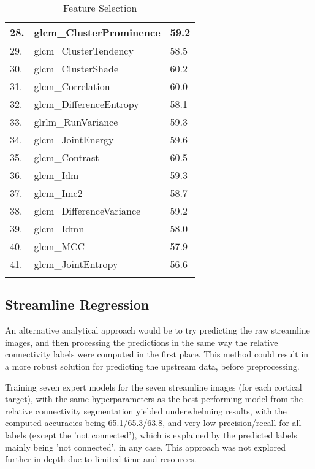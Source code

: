 \begin{longtable}[H]{|l|l|l|}
28. & glcm\_ClusterProminence & 59.2 \\ \hline
29. & glcm\_ClusterTendency & 58.5 \\ \hline
30. & glcm\_ClusterShade & 60.2 \\ \hline
31. & glcm\_Correlation & 60.0 \\ \hline
32. & glcm\_DifferenceEntropy & 58.1 \\ \hline
33. & glrlm\_RunVariance & 59.3 \\ \hline
34. & glcm\_JointEnergy & 59.6 \\ \hline
35. & glcm\_Contrast & 60.5 \\ \hline
36. & glcm\_Idm & 59.3 \\ \hline
37. & glcm\_Imc2 & 58.7 \\ \hline
38. & glcm\_DifferenceVariance & 59.2 \\ \hline
39. & glcm\_Idmn & 58.0 \\ \hline
40. & glcm\_MCC & 57.9 \\ \hline
41. & glcm\_JointEntropy & 56.6 \\ \hline
\caption{Feature Selection}
\label{tab:sbf}
\end{longtable}

\subsection{Streamline Regression}

An alternative analytical approach would be to try predicting the raw streamline images, and then processing the predictions in the same way the relative connectivity labels were computed in the first place. This method could result in a more robust solution for predicting the upstream data, before preprocessing.\par
Training seven expert models for the seven streamline images (for each cortical target), with the same hyperparameters as the best performing model from the relative connectivity segmentation yielded underwhelming results, with the computed accuracies being 65.1/65.3/63.8, and very low precision/recall for all labels (except the ’not connected’), which is explained by the predicted labels mainly being ’not connected’, in any case. This approach was not explored further in depth due to limited time and resources.




